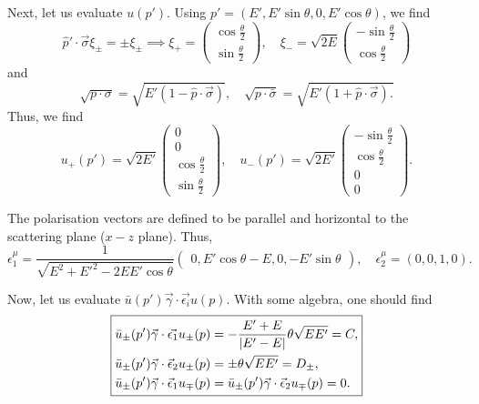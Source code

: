 \documentclass[11pt]{article}
\theoremstyle{definition}
\begin{document}
Next, let us evaluate $u(p')$. Using $p' = (E', E'\sin\theta,0,E'\cos\theta)$, we find
\begin{equation}
    \hat{p}'\cdot \vec{\sigma} \xi_\pm = \pm \xi_\pm \implies \xi_+ = \begin{pmatrix}
        \cos\frac{\theta}{2}\\\sin\frac{\theta}{2}
    \end{pmatrix},\quad \xi_- = \sqrt{2E}\begin{pmatrix}
        -\sin\frac{\theta}{2}\\\cos\frac{\theta}{2}
    \end{pmatrix}
\end{equation}
and
\begin{equation}
    \sqrt{p\cdot \sigma} = \sqrt{E'(1-\hat{p}\cdot \vec{\sigma})}, \quad \sqrt{p\cdot \bar{\sigma}} = \sqrt{E'(1+\hat{p}\cdot \vec{\sigma}).}
\end{equation}
Thus, we find
\begin{equation}
    \boxed{
    u_+(p') = \sqrt{2E'}\begin{pmatrix}
        0\\0\\ \cos\frac{\theta}{2}\\\sin\frac{\theta}{2}
    \end{pmatrix},\quad 
    u_-(p') = \sqrt{2E'}\begin{pmatrix}
        -\sin\frac{\theta}{2}\\\cos\frac{\theta}{2}\\0\\0
    \end{pmatrix}
    .}
\end{equation}

The polarisation vectors are defined to be parallel and horizontal to the scattering plane ($x-z$ plane). Thus,
\begin{equation}
    \boxed{
    \epsilon_1^\mu = \frac{1}{\sqrt{E^2+E'^2-2EE'\cos\theta}}\begin{pmatrix}
        0, E'\cos\theta-E, 0, -E'\sin\theta
    \end{pmatrix},\quad
    \epsilon_2^\mu = (0,0,1,0).
    }
\end{equation}

Now, let us evaluate $\bar{u}(p')\vec{\gamma}\cdot\vec{\epsilon_i}u(p)$. With some algebra, one should find
\begin{equation}
\boxed{
    \begin{aligned}
        &\bar{u}_\pm(p')\vec{\gamma}\cdot\vec{\epsilon_1}u_\pm(p) = -\frac{E'+E}{\abs{E'-E}}\theta\sqrt{EE'} = C,\\
        &\bar{u}_\pm(p')\vec{\gamma}\cdot\vec{\epsilon}_2u_\pm(p) = \pm\theta\sqrt{EE'} = D_\pm,\\
        &\bar{u}_\pm(p')\vec{\gamma}\cdot\vec{\epsilon}_1u_\mp(p) = \bar{u}_\pm(p')\vec{\gamma}\cdot\vec{\epsilon}_2u_\mp(p) = 0.
    \end{aligned}}
\end{equation}
\end{document}
